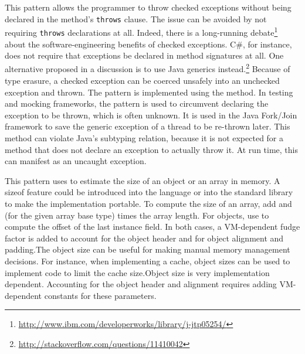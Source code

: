 %
{This pattern allows the programmer to throw checked exceptions without being
declared in the method's \texttt{throws} clause.}
{The issue can be avoided by not requiring \texttt{throws} declarations at
  all. Indeed, there is a long-running
  debate\footnote{\url{http://www.ibm.com/developerworks/library/j-jtp05254/}} about the
  software-engineering benefits of checked exceptions.
C\#, for instance, does not require that exceptions be declared in method signatures at all.
One alternative proposed in a \stackoverflow
discussion is to use Java generics
instead.\footnote{\url{http://stackoverflow.com/questions/11410042}} Because
of type erasure, a checked exception can be coerced unsafely into an unchecked exception and thrown.
}
{The pattern is implemented using the  method.}
{In testing and mocking frameworks, the pattern is used to circumvent declaring
  the exception to be thrown, which is often unknown.
It is used in the Java Fork/Join framework to save the generic exception of a thread to be re-thrown later.}
{This method can violate Java's subtyping
  relation, because it is not expected
  for a method that does not declare an exception to actually throw it. At
  run time, this can manifest as an uncaught exception.}

\newcommand\foundinsize{4}
\newcommand\usedbysize{3003}
\newcommand\mostusedsize{\sizemost}
\newcommand\memberssize{\member{array\-Base\-Offset}, \member{array\-Index\-Scale},
\member{object\-Field\-Offset}}
\newcommand\namesize{Get the Size of an Object or an Array}

%
{This pattern uses \smu{} to estimate the size of an object or an array in
memory.}
{A sizeof feature could be introduced into the language or
into the standard library to make the implementation portable.}
{To compute the size of an array, add  and
 (for the given array base type) times the array
length. For objects, use  to compute the offset
of the last instance field. In both cases, a VM-dependent fudge factor is
added to account for the object header and for object alignment and padding.}{The object
size can be useful for making manual memory management decisions. For
instance, when implementing a cache, object sizes can be used to implement
code to limit the cache size.}{Object
size is very implementation dependent. Accounting for the object header and
alignment requires adding VM-dependent constants for these parameters.}

